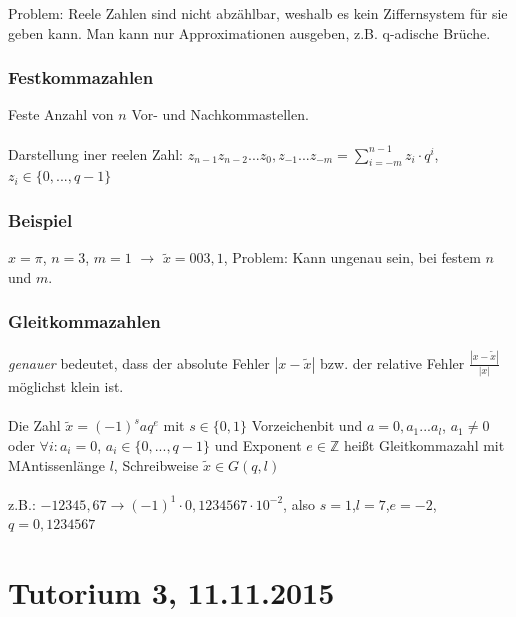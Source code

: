 \documentclass{llncs}
\begin{document}
Problem: Reele Zahlen sind nicht abz\"ahlbar, weshalb es kein Ziffernsystem f\"ur sie geben kann. Man kann nur Approximationen ausgeben, z.B. q-adische Br\"uche.

\subsection*{Festkommazahlen}

Feste Anzahl von $n$ Vor- und Nachkommastellen.\\
\\
Darstellung iner reelen Zahl: $z_{n-1}z_{n-2}...z_{0},z_{-1}...z_{-m} = \sum_{i=-m}^{n-1} z_i \cdot q^{i}$, $z_i \in \{0,...,q-1\}$

\subsection*{Beispiel}

$x = \pi$, $n=3$, $m=1$ $\rightarrow$ $\tilde{x} = 003,1$, Problem: Kann ungenau sein, bei festem $n$ und $m$.

\subsection*{Gleitkommazahlen}

\textit{genauer} bedeutet, dass der absolute Fehler $| x - \tilde{x} |$ bzw. der relative Fehler $\frac{| x - \tilde{x} |}{|x|}$ möglichst klein ist.\\
\\
Die Zahl $\tilde{x} = (-1)^{s}aq^{e}$ mit $s \in \{0,1\}$ Vorzeichenbit und $a=0,a_{1}...a_{l}$, $a_1 \neq 0$ oder $\forall i: a_{i} = 0$, $a_i \in \{0,...,q-1\}$ und Exponent $e \in \mathbb{Z}$ heißt Gleitkommazahl mit MAntissenl\"ange $l$, Schreibweise $\tilde{x} \in G(q,l)$\\
\\
z.B.: $-12345,67 \longrightarrow (-1)^1 \cdot 0,1234567 \cdot 10^{-2}$, also $s=1$,$l=7$,$e=-2$, $q=0,1234567$
\chapter*{Tutorium 3, 11.11.2015}
\end{document}
